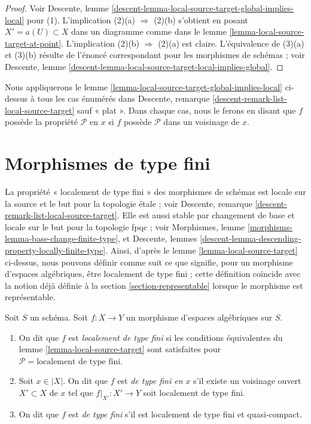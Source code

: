 \begin{proof}
Voir
Descente, lemme \ref{descent-lemma-local-source-target-global-implies-local}
pour (1). L'implication (2)(a) $\Rightarrow$ (2)(b) s'obtient en posant
$X' = a(U) \subset X$ dans un diagramme comme dans le
lemme \ref{lemma-local-source-target-at-point}.
L'implication (2)(b) $\Rightarrow$ (2)(a) est claire.
L'équivalence de (3)(a) et (3)(b) résulte de l'énoncé correspondant
pour les morphismes de schémas ; voir
Descente, lemme \ref{descent-lemma-local-source-target-local-implies-global}.
\end{proof}

\begin{remark}
\label{remark-when-apply}
Nous appliquerons le
lemme \ref{lemma-local-source-target-global-implies-local}
ci-dessus à tous les cas énumérés dans
Descente, remarque \ref{descent-remark-list-local-source-target}
sauf « plat ». Dans chaque cas, nous le ferons en disant que
$f$ possède la propriété $\mathcal{P}$ en $x$ si $f$ possède
$\mathcal{P}$ dans un voisinage de $x$.
\end{remark}




\section{Morphismes de type fini}
\label{section-finite-type}

\noindent
La propriété « localement de type fini » des morphismes de schémas
est locale sur la source et le but pour la topologie étale ; voir
Descente, remarque \ref{descent-remark-list-local-source-target}.
Elle est aussi stable par changement de base et locale sur le but pour
la topologie fpqc ; voir Morphismes, lemme \ref{morphisms-lemma-base-change-finite-type}, et
Descente, lemmes \ref{descent-lemma-descending-property-locally-finite-type}.
Ainsi, d'après le
lemme \ref{lemma-local-source-target}
ci-dessus, nous pouvons définir comme suit ce que signifie, pour un morphisme
d'espaces algébriques, être localement de type fini ;
cette définition coïncide avec la notion déjà définie à la
section \ref{section-representable}
lorsque le morphisme est représentable.

\begin{definition}
\label{definition-locally-finite-type}
Soit $S$ un schéma.
Soit $f : X \to Y$ un morphisme d'espaces algébriques sur $S$.
\begin{enumerate}
\item On dit que $f$ est
{\it localement de type fini} si les conditions équivalentes du
lemme \ref{lemma-local-source-target}
sont satisfaites pour
$\mathcal{P} = \text{localement de type fini}$.
\item Soit $x \in |X|$. On dit que $f$ est {\it de type fini en $x$}
s'il existe un voisinage ouvert $X' \subset X$ de $x$ tel
que $f|_{X'} : X' \to Y$ soit localement de type fini.
\item On dit que $f$ est
{\it de type fini} s'il est localement de type fini et quasi-compact.
\end{enumerate}
\end{definition}

